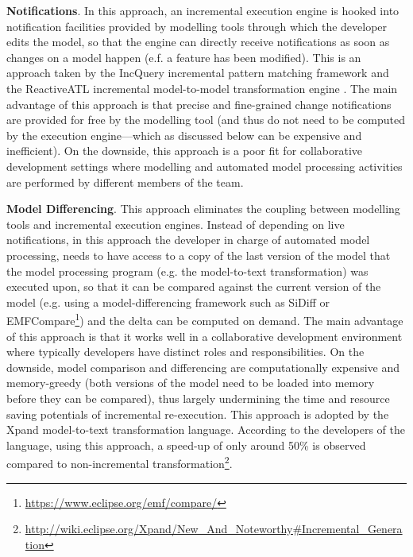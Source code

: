 \documentclass[12pt, a4paper]{report} \usepackage[titletoc]{appendix}
\begin{document}
\textbf{Notifications}. In this approach, an incremental execution engine is hooked into notification facilities provided by modelling tools through which the developer edits the model, so that the engine can directly receive notifications as soon as changes on a model happen (e.f. a feature has been modified). This is an approach taken by the IncQuery incremental pattern matching framework \cite{rath2012derived} and the ReactiveATL incremental model-to-model transformation engine \cite{ogunyomi2015property}. The main advantage of this approach is that precise and fine-grained change notifications are provided for free by the modelling tool (and thus do not need to be computed by the execution engine---which as discussed below can be expensive and inefficient). On the downside, this approach is a poor fit for collaborative development settings where modelling and automated model processing activities are performed by different members of the team.

\textbf{Model Differencing}. This approach eliminates the coupling between modelling tools and incremental execution engines. Instead of depending on live notifications, in this approach the developer in charge of automated model processing, needs to have access to a copy of the last version of the model that the model processing program (e.g. the model-to-text transformation) was executed upon, so that it can be compared against the current version of the model (e.g. using a model-differencing framework such as SiDiff \cite{kelter2005generic} or EMFCompare\footnote{\url{https://www.eclipse.org/emf/compare/}}) and the delta can be computed on demand. The main advantage of this approach is that it works well in a collaborative development environment where typically developers have distinct roles and responsibilities. On the downside, model comparison and differencing are computationally expensive and memory-greedy (both versions of the model need to be loaded into memory before they can be compared), thus largely undermining the time and resource saving potentials of incremental re-execution. This approach is adopted by the Xpand model-to-text transformation language. According to the developers of the language, using this approach, a speed-up of only around 50\% is observed compared to non-incremental transformation\footnote{\url{http://wiki.eclipse.org/Xpand/New_And_Noteworthy\#Incremental_Generation}}.
\end{document}
